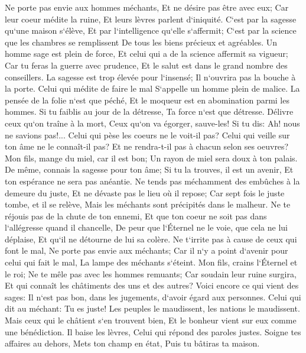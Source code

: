 \verse Ne porte pas envie aux hommes méchants, Et ne désire pas être avec eux; 
\verse Car leur coeur médite la ruine, Et leurs lèvres parlent d`iniquité. 
\verse C`est par la sagesse qu`une maison s`élève, Et par l`intelligence qu`elle s`affermit; 
\verse C`est par la science que les chambres se remplissent De tous les biens précieux et agréables. 
\verse Un homme sage est plein de force, Et celui qui a de la science affermit sa vigueur; 
\verse Car tu feras la guerre avec prudence, Et le salut est dans le grand nombre des conseillers. 
\verse La sagesse est trop élevée pour l`insensé; Il n`ouvrira pas la bouche à la porte. 
\verse Celui qui médite de faire le mal S`appelle un homme plein de malice. 
\verse La pensée de la folie n`est que péché, Et le moqueur est en abomination parmi les hommes. 
\verse Si tu faiblis au jour de la détresse, Ta force n`est que détresse. 
\verse Délivre ceux qu`on traîne à la mort, Ceux qu`on va égorger, sauve-les! 
\verse Si tu dis: Ah! nous ne savions pas!... Celui qui pèse les coeurs ne le voit-il pas? Celui qui veille sur ton âme ne le connaît-il pas? Et ne rendra-t-il pas à chacun selon ses oeuvres? 
\verse Mon fils, mange du miel, car il est bon; Un rayon de miel sera doux à ton palais. 
\verse De même, connais la sagesse pour ton âme; Si tu la trouves, il est un avenir, Et ton espérance ne sera pas anéantie. 
\verse Ne tends pas méchamment des embûches à la demeure du juste, Et ne dévaste pas le lieu où il repose; 
\verse Car sept fois le juste tombe, et il se relève, Mais les méchants sont précipités dans le malheur. 
\verse Ne te réjouis pas de la chute de ton ennemi, Et que ton coeur ne soit pas dans l`allégresse quand il chancelle, 
\verse De peur que l`Éternel ne le voie, que cela ne lui déplaise, Et qu`il ne détourne de lui sa colère. 
\verse Ne t`irrite pas à cause de ceux qui font le mal, Ne porte pas envie aux méchants; 
\verse Car il n`y a point d`avenir pour celui qui fait le mal, La lampe des méchants s`éteint. 
\verse Mon fils, crains l`Éternel et le roi; Ne te mêle pas avec les hommes remuants; 
\verse Car soudain leur ruine surgira, Et qui connaît les châtiments des uns et des autres? 
\verse Voici encore ce qui vient des sages: Il n`est pas bon, dans les jugements, d`avoir égard aux personnes. 
\verse Celui qui dit au méchant: Tu es juste! Les peuples le maudissent, les nations le maudissent. 
\verse Mais ceux qui le châtient s`en trouvent bien, Et le bonheur vient sur eux comme une bénédiction. 
\verse Il baise les lèvres, Celui qui répond des paroles justes. 
\verse Soigne tes affaires au dehors, Mets ton champ en état, Puis tu bâtiras ta maison. 
